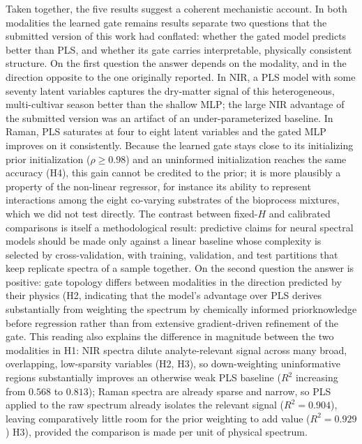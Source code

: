 \documentclass[preprint,12pt]{elsarticle}
\providecommand{\DIFaddtex}[1]{{\protect\color{blue} \sf #1}} %
\providecommand{\DIFdeltex}[1]{{\protect\color{red} \scriptsize #1}} %
\providecommand{\DIFaddbegin}{} %
\providecommand{\DIFaddend}{} %
\providecommand{\DIFdelbegin}{} %
\providecommand{\DIFdelend}{} %
\providecommand{\DIFadd}[1]{\texorpdfstring{\DIFaddtex{#1}}{#1}} %
\providecommand{\DIFdel}[1]{\texorpdfstring{\DIFdeltex{#1}}{}} %
\providecommand{\DIFscaledelfig}{0.5}
\newlength{\DIFdelgraphicswidth} %
\newlength{\DIFdelgraphicsheight} %
\providecommand{\DIFaddincludegraphics}[2][]{{\color{blue}\fbox{\DIFOincludegraphics[#1]{#2}}}} %
\providecommand{\DIFdelincludegraphics}[2][]{%
\sbox{\DIFdelgraphicsbox}{\DIFOincludegraphics[#1]{#2}}%
\settoboxwidth{\DIFdelgraphicswidth}{\DIFdelgraphicsbox} %
\settoboxtotalheight{\DIFdelgraphicsheight}{\DIFdelgraphicsbox} %
\scalebox{\DIFscaledelfig}{%
\parbox[b]{\DIFdelgraphicswidth}{\usebox{\DIFdelgraphicsbox}\\[-\baselineskip] \rule{\DIFdelgraphicswidth}{0em}}\llap{\resizebox{\DIFdelgraphicswidth}{\DIFdelgraphicsheight}{%
\setlength{\unitlength}{\DIFdelgraphicswidth}%
\begin{picture}(1,1)%
\thicklines\linethickness{2pt} %
{\color[rgb]{1,0,0}\put(0,0){\framebox(1,1){}}}%
{\color[rgb]{1,0,0}\put(0,0){\line( 1,1){1}}}%
{\color[rgb]{1,0,0}\put(0,1){\line(1,-1){1}}}%
\end{picture}%
}\hspace*{3pt}}} %
} %
\DeclareRobustCommand{\DIFaddbegin}{\DIFOaddbegin \let\includegraphics\DIFaddincludegraphics} %
\DeclareRobustCommand{\DIFaddend}{\DIFOaddend \let\includegraphics\DIFOincludegraphics} %
\DeclareRobustCommand{\DIFdelbegin}{\DIFOdelbegin \let\includegraphics\DIFdelincludegraphics} %
\DeclareRobustCommand{\DIFdelend}{\DIFOaddend \let\includegraphics\DIFOincludegraphics} %
\begin{document}
Taken together, the \DIFdelbegin \DIFdel{five results suggest a coherent mechanistic account. In both modalities the learned gate remains }\DIFdelend \DIFaddbegin \DIFadd{results separate two questions that the submitted version of this work had conflated: whether the gated model predicts better than PLS, and whether its gate carries interpretable, physically consistent structure. On the first question the answer depends on the modality, and in the direction opposite to the one originally reported. In NIR, a PLS model with some seventy latent variables captures the dry-matter signal of this heterogeneous, multi-cultivar season better than the shallow MLP; the large NIR advantage of the submitted version was an artifact of an under-parameterized baseline. In Raman, PLS saturates at four to eight latent variables and the gated MLP improves on it consistently. Because the learned gate stays }\DIFaddend close to its \DIFdelbegin \DIFdel{initializing prior }\DIFdelend \DIFaddbegin \DIFadd{initialization }\DIFaddend ($\rho\geq0.98$) \DIFaddbegin \DIFadd{and an uninformed initialization reaches the same accuracy (H4), this gain cannot be credited to the prior; it is more plausibly a property of the non-linear regressor, for instance its ability to represent interactions among the eight co-varying substrates of the bioprocess mixtures, which we did not test directly. The contrast between fixed-$H$ and calibrated comparisons is itself a methodological result: predictive claims for neural spectral models should be made only against a linear baseline whose complexity is selected by cross-validation, with training, validation, and test partitions that keep replicate spectra of a sample together. On the second question the answer is positive: gate topology differs between modalities in the direction predicted by their physics (H2}\DIFaddend , \DIFdelbegin \DIFdel{indicating that the model's advantage over PLS derives substantially from weighting the spectrum by chemically informed priorknowledge before regression rather than from extensive gradient-driven refinement of the gate. This reading also explains the difference in magnitude between the two modalities in H1: NIR spectra dilute analyte-relevant signal across many broad, overlapping, low-sparsity variables (H2, H3), so down-weighting uninformative regions substantially improves an otherwise weak PLS baseline ($R^{2}$ increasing from $0.568$ to $0.813$); Raman spectra are already sparse and narrow, so PLS applied to the raw spectrum already isolates the relevant signal ($R^{2}=0.904$), leaving comparatively little room for the prior weighting to add value ($R^{2}=0.929$)}\DIFdelend \DIFaddbegin \DIFadd{H3), provided the comparison is made per unit of physical spectrum}\DIFaddend .
\end{document}
